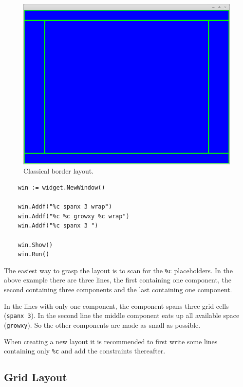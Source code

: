 \begin{figure}[ht]
\centering
\includegraphics[width=12cm]{img/borderlayout.png}
\caption{Classical border layout.}
\end{figure}

\begin{verbatim}
    win := widget.NewWindow()

    win.Addf("%c spanx 3 wrap")
    win.Addf("%c %c growxy %c wrap")
    win.Addf("%c spanx 3 ")

    win.Show()
    win.Run()
\end{verbatim}

The easiest way to grasp the layout is to scan for the \texttt{\%c}
placeholders. In the above example there are three lines, the first
containing one component, the second containing three components and the
last containing one component.

In the lines with only one component, the component spans three grid
cells (\texttt{spanx 3}). In the second line the middle component eats
up all available space (\texttt{growxy}). So the other components are
made as small as possible.

When creating a new layout it is recommended to first write some lines
containing only \texttt{\%c} and add the constraints thereafter.


\subsection{Grid Layout}

